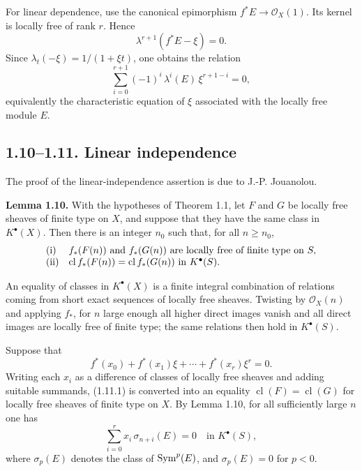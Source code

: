 \documentclass[11pt]{article}
\newcommand{\cl}{\operatorname{cl}}
\begin{document}
For linear dependence, use the canonical epimorphism \(f^*E\to\mathcal O_X(1)\). Its kernel is locally free of rank \(r\). Hence
\[
  \lambda^{r+1}(f^*E-\xi)=0.
\]
Since \(\lambda_t(-\xi)=1/(1+\xi t)\), one obtains the relation
\begin{equation}\tag{1.9.1}
  \sum_{i=0}^{r+1}(-1)^i\,\lambda^i(E)\,\xi^{r+1-i}=0,
\end{equation}
equivalently the characteristic equation of \(\xi\) associated with the locally free module \(E\).

\subsection*{1.10--1.11. Linear independence}
The proof of the linear-independence assertion is due to J.-P. Jouanolou.

\textbf{Lemma 1.10.} With the hypotheses of Theorem 1.1, let \(F\) and \(G\) be locally free sheaves of finite type on \(X\), and suppose that they have the same class in \(K^\bullet(X)\). Then there is an integer \(n_0\) such that, for all \(n\geq n_0\),
\[
\begin{array}{ll}
\text{\rm (i)}& f_*(F(n))\text{ and }f_*(G(n))\text{ are locally free of finite type on }S,\\
\text{\rm (ii)}& \cl f_*(F(n))=\cl f_*(G(n))\text{ in }K^\bullet(S).
\end{array}
\]

An equality of classes in \(K^\bullet(X)\) is a finite integral combination of relations coming from short exact sequences of locally free sheaves. Twisting by \(\mathcal O_X(n)\) and applying \(f_*\), for \(n\) large enough all higher direct images vanish and all direct images are locally free of finite type; the same relations then hold in \(K^\bullet(S)\).

Suppose that
\begin{equation}\tag{1.11.1}
  f^*(x_0)+f^*(x_1)\xi+\cdots+f^*(x_r)\xi^r=0 .
\end{equation}
Writing each \(x_i\) as a difference of classes of locally free sheaves and adding suitable summands, (1.11.1) is converted into an equality \(\cl(F)=\cl(G)\) for locally free sheaves of finite type on \(X\). By Lemma 1.10, for all sufficiently large \(n\) one has
\begin{equation}\tag{1.11.2}
  \sum_{i=0}^{r} x_i\,\sigma_{n+i}(E)=0
  \quad\text{in }K^\bullet(S),
\end{equation}
where \(\sigma_p(E)\) denotes the class of \(\operatorname{Sym}^p(E)\), and \(\sigma_p(E)=0\) for \(p<0\).
\end{document}
